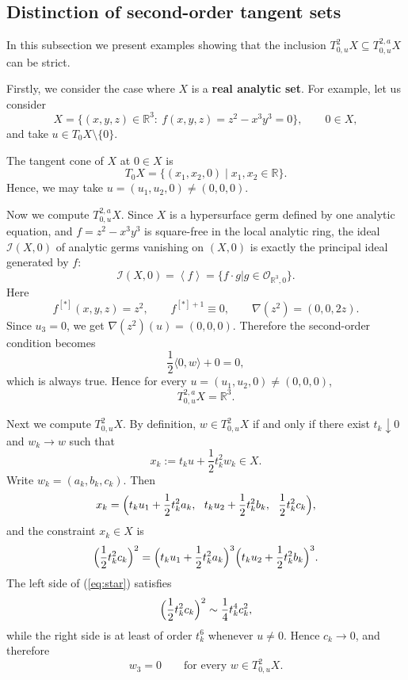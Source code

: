 \documentclass[10pt,reqno]{amsart}
\theoremstyle{break-italic}
\theoremstyle{break-italic}
\theoremstyle{break-italic}
\theoremstyle{break-italic}
\theoremstyle{break-italic}
\theoremstyle{break-italic}
\theoremstyle{break-italic}
\theoremstyle{break-italic}
\theoremstyle{break-roman}
\theoremstyle{standard}
\theoremstyle{varthm-roman}
\theoremstyle{varthm-italic}
\theoremstyle{varthm-roman-break}
\theoremstyle{varthm-italic-break}
\theoremstyle{varthm-roman-no-punctuation}
\theoremstyle{varthm-italic-no-punctuation}
\numberwithin{equation}{section}
\begin{document}
\subsection{Distinction of second-order tangent sets}\label{subsec:difference}


 In this subsection we present examples showing that the inclusion $T^{2}_{0,u}X \subseteq T^{2,a}_{0,u}X$ can be strict.

Firstly, we consider the case where $X$ is a \textbf{real analytic set}. For example, let us consider
$$
X=\bigl\{(x,y,z)\in\mathbb R^3:\ f(x,y,z)=z^{2}-x^{3}y^{3}=0\bigr\},\qquad 0\in X,
$$
and take \(u\in T_{0}X\setminus\{0\}\).

The tangent cone of $X$ at $0\in X$ is 
$$
T_0 X=\{(x_1,x_2,0) \mid x_1,x_2\in \mathbb R\}.
$$
Hence, we may take $u=(u_{1},u_{2},0)\not = (0,0,0)$.

Now we compute $T^{2,a}_{0,u}X$.   Since $X$ is a hypersurface germ defined by one analytic equation,
and $f = z^2 - x^3 y^3$ is square-free in the local analytic ring, the ideal $ \mathcal{I}(X, 0) $ of analytic germs vanishing on $(X, 0)$ is exactly the principal ideal generated by $f$:
$$\mathcal{I}(X, 0) = \left<f\right> = \{f \cdot g \vert g\in \mathcal{O}_{\mathbb R^3,0}\}.$$ Here
$$
f^{[*]}(x,y,z)=z^{2},\qquad f^{[*]+1}\equiv 0,\qquad \nabla(z^{2})=(0,0,2z).
$$
Since \(u_{3}=0\), we get \(\nabla(z^{2})(u)=(0,0,0)\). Therefore the second-order condition becomes
$$
\frac12\langle 0,w\rangle +0=0,
$$
which is always true. Hence for every \(u=(u_{1},u_{2},0)\neq (0,0,0)\),
$$
T^{2,a}_{0,u}X=\mathbb R^{3}.
$$

Next we compute $T^{2}_{0,u}X$. By definition, \(w\in T^{2}_{0,u}X\) if and only if there exist \(t_{k}\downarrow 0\) and \(w_{k}\to w\) such that
\[
x_{k}:=t_{k}u+\frac12 t_{k}^{2}w_{k}\in X.
\]
Write \(w_{k}=(a_{k},b_{k},c_{k})\). Then
\[
x_{k}=\Bigl(t_{k}u_{1}+\frac12 t_{k}^{2}a_{k},\ \ t_{k}u_{2}+\frac12 t_{k}^{2}b_{k},\ \ \frac12 t_{k}^{2}c_{k}\Bigr),
\]
and the constraint \(x_{k}\in X\) is
\begin{equation}\label{eq:star}
\Bigl(\frac12 t_{k}^{2}c_{k}\Bigr)^{2}
=
\Bigl(t_{k}u_{1}+\frac12 t_{k}^{2}a_{k}\Bigr)^{3}
\Bigl(t_{k}u_{2}+\frac12 t_{k}^{2}b_{k}\Bigr)^{3}.
\end{equation}
The left side of (\ref{eq:star}) satisfies
\[
\Bigl(\frac12 t_{k}^{2}c_{k}\Bigr)^{2}\sim \frac14 t_{k}^{4}c_{k}^{2},
\]
while the right side is at least of order \(t_{k}^{6}\) whenever \(u\neq 0\). Hence \(c_{k}\to 0\), and therefore
\[
w_{3}=0\qquad\text{for every } w\in T^{2}_{0,u}X.
\]
 
\end{document}
